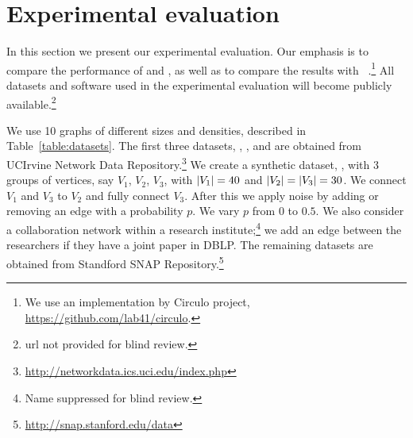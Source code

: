 \section{Experimental evaluation}
\label{sec:exp}

In this section we present our experimental evaluation.  Our emphasis is to
compare the performance of \alggreedy and \algiterative, as well as to compare
the results with \algrolx~\cite{henderson2012rolx}.\footnote{We use an implementation by Circulo project, \url{https://github.com/lab41/circulo}.}
All datasets and software used in the experimental evaluation
will become publicly available.\footnote{{\sc url} not provided for blind review.}


We use 10 graphs of different sizes and densities, described in Table~\ref{table:datasets}.
The first three datasets, \karate, \dolphins, and \lesmis are obtained from UCIrvine Network Data
Repository.\footnote{\url{http://networkdata.ics.uci.edu/index.php}}
We create a synthetic dataset, \synth, with 3 groups of vertices, say $V_1$,
$V_2$, $V_3$, with ${\left|V_1\right|} = 40$ and ${\left|V_2\right|} = {\left|V_3\right|} = 30$. 
We connect $V_1$ and $V_3$ to $V_2$ and fully connect $V_3$. After this
we apply noise by adding or removing an edge with a probability $p$. We vary $p$ from $0$ to $0.5$.
We also consider a collaboration network within a research
institute;\footnote{Name suppressed for blind review.} we add an edge
between the researchers if they have a joint paper in DBLP.
The
remaining datasets are obtained from Standford SNAP
Repository.\footnote{\url{http://snap.stanford.edu/data}}
\iffalse
\begin{itemize}
\item {\karate:} a social network of friendships between members of karate club at a US university in 1970.
\item {\dolphins:}  a social network of frequent associations between dolphins in a community living off Doubtful Sound in New Zealand.
\item {\lesmis:} co-appearance of characters in Les Miserables novel by Victor Hugo.
\item {\facebook:} friends list of Facebook users.
\item {\enron:} an e-mail communication network by Enron employees.
\item {\EUall:} an e-mail network from a EU research institution.
\item {\dblp:} a co-authorship network among computer science researchers.
\item {\youtube:} Youtube users network.
\end{itemize}
\fi

